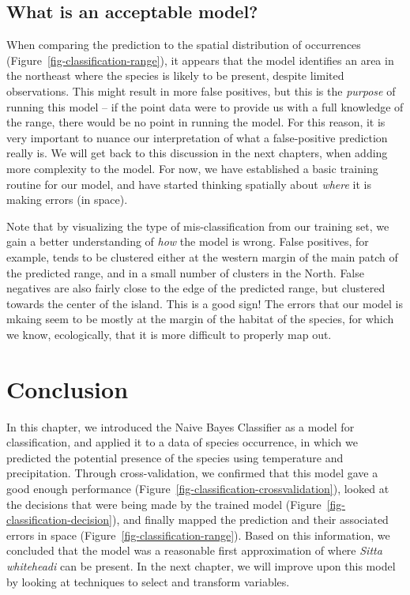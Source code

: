 \documentclass[
  letterpaper,
]{scrbook}
\begin{document}
\subsection{What is an acceptable
model?}\label{what-is-an-acceptable-model}

When comparing the prediction to the spatial distribution of occurrences
(Figure~\ref{fig-classification-range}), it appears that the model
identifies an area in the northeast where the species is likely to be
present, despite limited observations. This might result in more false
positives, but this is the \emph{purpose} of running this model -- if
the point data were to provide us with a full knowledge of the range,
there would be no point in running the model. For this reason, it is
very important to nuance our interpretation of what a false-positive
prediction really is. We will get back to this discussion in the next
chapters, when adding more complexity to the model. For now, we have
established a basic training routine for our model, and have started
thinking spatially about \emph{where} it is making errors (in space).

Note that by visualizing the type of mis-classification from our
training set, we gain a better understanding of \emph{how} the model is
wrong. False positives, for example, tends to be clustered either at the
western margin of the main patch of the predicted range, and in a small
number of clusters in the North. False negatives are also fairly close
to the edge of the predicted range, but clustered towards the center of
the island. This is a good sign! The errors that our model is mkaing
seem to be mostly at the margin of the habitat of the species, for which
we know, ecologically, that it is more difficult to properly map out.

\section{Conclusion}\label{conclusion-3}

In this chapter, we introduced the Naive Bayes Classifier as a model for
classification, and applied it to a data of species occurrence, in which
we predicted the potential presence of the species using temperature and
precipitation. Through cross-validation, we confirmed that this model
gave a good enough performance
(Figure~\ref{fig-classification-crossvalidation}), looked at the
decisions that were being made by the trained model
(Figure~\ref{fig-classification-decision}), and finally mapped the
prediction and their associated errors in space
(Figure~\ref{fig-classification-range}). Based on this information, we
concluded that the model was a reasonable first approximation of where
\emph{Sitta whiteheadi} can be present. In the next chapter, we will
improve upon this model by looking at techniques to select and transform
variables.
\end{document}
